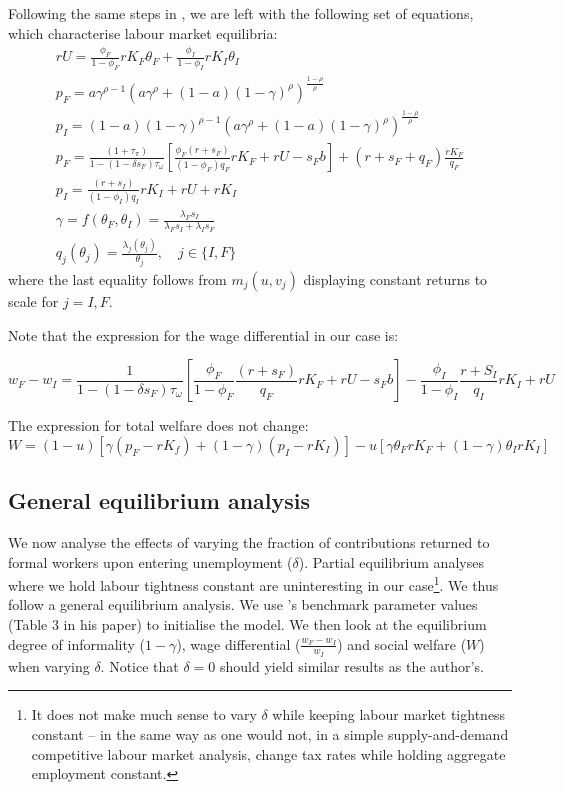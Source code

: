 \documentclass[12pt]{article}
\begin{document}
Following the same steps in \cite{Ulyssea2010}, we are left with the following set of equations, which characterise labour market equilibria:
\begin{align}
rU = \frac{\phi_F}{1-\phi_F}rK_F\theta_F + \frac{\phi_I}{1-\phi_I}rK_I\theta_I  \\
p_F = a \gamma^{\rho -1}(a \gamma^\rho  + (1-a)(1-\gamma)^\rho)^\frac{1-\rho}{\rho} \\
p_I = (1-a)(1-\gamma)^{\rho-1} (a \gamma^\rho + (1-a)(1-\gamma)^\rho )^\frac{1-\rho}{\rho}\\
p_F= \frac{(1+\tau_\pi)}{1 - (1 - \delta s_F)\tau_\omega}\left[\frac{\phi_F(r+s_F)}{(1-\phi_F)q_F}rK_F + rU-s_Fb\right] + (r + s_F + q_F)\frac{rK_F}{q_F} \\
p_I = \frac{(r+s_I)}{(1-\phi_I)q_I}rK_I + rU + rK_I \\
\gamma = f(\theta_F,\theta_I) = \frac{\lambda_F s_I}{\lambda_F s_I + \lambda_I s_F}\\
q_j(\theta_j) = \frac{\lambda_j (\theta_j)}{\theta_j}, \quad j\in\{I,F\}
\end{align}
where the last equality follows from $m_j(u, v_j)$ displaying constant returns to scale for $j = I, F$.

Note that the expression for the wage differential in our case is:

\begin{equation}
    w_F - w_I = \frac{1}{1 - (1 - \delta s_F)\tau_\omega} \left[\frac{\phi_F}{1-\phi_F}\frac{(r+s_F)}{q_F}rK_F +rU-s_Fb\right] - \frac{\phi_I}{1-\phi_I} \frac{r + S_I}{q_I} r K_I + rU
\end{equation}

The expression for total welfare does not change:
\begin{equation}
    W = (1 - u)[\gamma(p_F - rK_f) + (1-\gamma)(p_I - rK_I)] - u [\gamma \theta_F r K_F + (1-\gamma) \theta_I r K_I]
\end{equation}
\subsection*{General equilibrium analysis}
We now analyse the effects of varying the fraction of contributions returned to formal workers upon entering unemployment ($\delta$). Partial equilibrium analyses where we hold labour tightness constant are uninteresting in our case\footnote{It does not make much sense to vary $\delta$ while keeping labour market tightness constant -- in the same way as one would not, in a simple supply-and-demand competitive labour market analysis, change tax rates while holding aggregate employment constant.}. We thus follow a general equilibrium analysis. We use \cite{Ulyssea2010}'s benchmark parameter values  (Table 3 in his paper) to initialise the model. We then look at the equilibrium degree of informality ($1-\gamma$), wage differential ($\frac{w_F - w_I}{w_I}$) and social welfare ($W$) when varying $\delta$. Notice that $\delta = 0$ should yield similar results as the author's.
\end{document}
